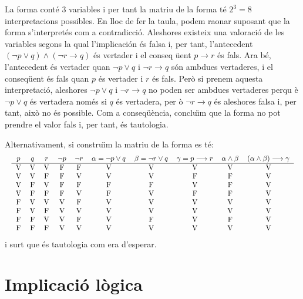 \begin{solucio}
La forma cont\'{e} 3 variables i per tant la matriu de la forma t\'{e} $%
2^{3}=8$ interpretacions possibles. En lloc de fer la taula, podem raonar
suposant que la forma s'interpret\'{e}s com a contradicci\'{o}. Aleshores
existeix una valoraci\'{o} de les variables segons la qual l'implicaci\'{o}n
\'{e}s falsa i, per tant, l'antecedent $\left( \lnot p\vee q\right)
\wedge\left( \lnot r\longrightarrow q\right) $ \'{e}s vertader i el conseq%
\"{u}ent $p\longrightarrow r$ \'{e}s fals. Ara b\'{e}, l'antecedent \'{e}s
vertader quan $\lnot p\vee q$ i $\lnot r\longrightarrow q$ s\'{o}n ambdues
vertaderes, i el conseq\"{u}ent \'{e}s fals quan $p$ \'{e}s vertader i $r$
\'{e}s fals. Per\`{o} si prenem aquesta interpretaci\'{o}, aleshores $\lnot
p\vee q$ i $\lnot r\longrightarrow q$ no poden ser ambdues vertaderes perqu%
\`{e} $\lnot p\vee q$ \'{e}s vertadera nom\'{e}s si $q$ \'{e}s vertadera, per%
\`{o} $\lnot r\longrightarrow q$ \'{e}s aleshores falsa i, per tant, aix\`{o}
no \'{e}s possible. Com a conseq\"{u}\`{e}ncia, conclu\"{\i}m que la forma
no pot prendre el valor fals i, per tant, \'{e}s tautologia.

Alternativament, si constru\"{\i}m la matriu de la forma es t\'{e}:%
\begin{equation*}
\resizebox{\textwidth}{!}{%
\begin{tabular}{cccccccccc}
$p$ & $q$ & $r$ & $\lnot p$ & $\lnot r$ & $\alpha=\lnot p\vee q$ & $%
\beta=\lnot r\vee q$ & $\gamma=p\longrightarrow r$ & $\alpha\wedge\beta$ & $%
\left( \alpha\wedge\beta\right) \longrightarrow\gamma$ \\ \hline
V & V & V & F & F & V & V & V & V & V \\
V & V & F & F & V & V & V & F & F & V \\
V & F & V & F & F & F & F & V & F & V \\
V & F & F & F & V & F & V & F & F & V \\
F & V & V & V & F & V & V & V & V & V \\
F & V & F & V & V & V & V & V & V & V \\
F & F & V & V & F & V & F & V & F & V \\
F & F & F & V & V & V & V & V & V & V%
\end{tabular}%
}
\end{equation*}
i surt que \'{e}s tautologia com era d'esperar.
\end{solucio}

\section{Implicaci\'{o} l\`{o}gica\label{sec:implicacio-logica}}


